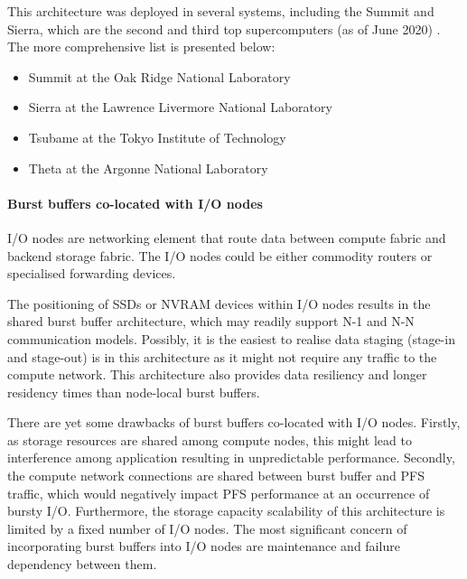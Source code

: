 \documentclass[thesis-en.tex]{subfiles}
\begin{document}
This architecture was deployed in several systems, including the Summit and Sierra, which are the second and third top supercomputers (as of June 2020) \cite{top500}. The more comprehensive list is presented below:
\begin{itemize}
\item Summit at the Oak Ridge National Laboratory \cite{osti_1489443}
\item Sierra at the Lawrence Livermore National Laboratory \cite{osti_1489443}
\item Tsubame at the Tokyo Institute of Technology \cite{tsubame}
\item Theta at the Argonne National Laboratory \cite{theta-fs}
\end{itemize}


\paragraph{Burst buffers co-located with I/O nodes}
I/O nodes are networking element that route data between compute fabric and backend storage fabric. The I/O nodes could be either commodity routers or specialised forwarding devices.

The positioning of SSDs or NVRAM devices within I/O nodes results in the shared burst buffer architecture, which may readily support N-1 and N-N communication models. Possibly, it is the easiest to realise data staging (stage-in and stage-out) is in this architecture as it might not require any traffic to the compute network. This architecture also provides data resiliency and longer residency times than node-local burst buffers. 

There are yet some drawbacks of burst buffers co-located with I/O nodes. Firstly, as storage resources are shared among compute nodes, this might lead to interference among application resulting in unpredictable performance. Secondly, the compute network connections are shared between burst buffer and PFS traffic, which would negatively impact PFS performance at an occurrence of bursty I/O. Furthermore, the storage capacity scalability of this architecture is limited by a fixed number of I/O nodes. The most significant concern of incorporating burst buffers into I/O nodes are maintenance and failure dependency between them.
\end{document}
